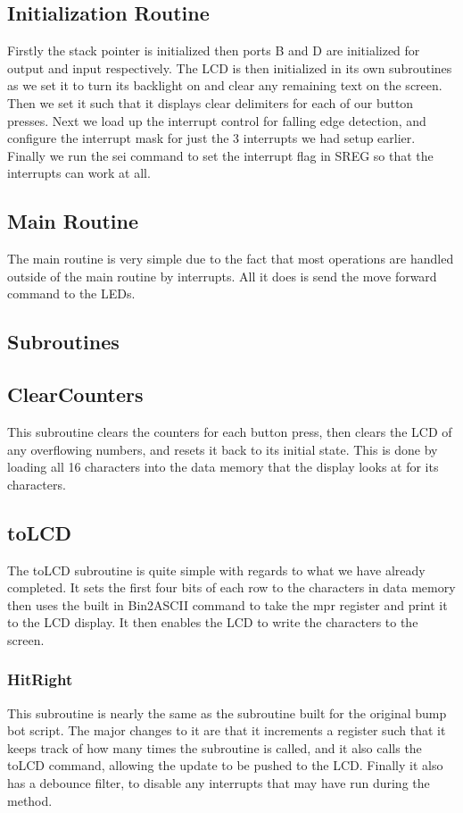 \documentclass[12pt,letterpaper]{article}
\begin{document}
\subsection{Initialization Routine}
Firstly the stack pointer is initialized then ports B and D are initialized for output and input respectively. The LCD is then initialized in its own subroutines as we set it to turn its backlight on and clear any remaining text on the screen. Then we set it such that it displays clear delimiters for each of our button presses. Next we load up the interrupt control for falling edge detection, and configure the interrupt mask for just the 3 interrupts we had setup earlier. Finally we run the sei command to set the interrupt flag in SREG so that the interrupts can work at all.

\subsection{Main Routine}
The main routine is very simple due to the fact that most operations are handled outside of the main routine by interrupts. All it does is send the move forward command to the LEDs.


\subsection{Subroutines}
	\subsection{ClearCounters}
	This subroutine clears the counters for each button press, then clears the LCD of any overflowing numbers, and resets it back to its initial state. This is done by loading all 16 characters into the data memory that the display looks at for its characters.  
	
	\subsection{toLCD}
	The toLCD subroutine is quite simple with regards to what we have already completed. It sets the first four bits of each row to the characters in data memory then uses the built in Bin2ASCII command to take the mpr register and print it to the LCD display. It then enables the LCD to write the characters to the screen.

	\subsubsection{HitRight}
	This subroutine is nearly the same as the subroutine built for the original bump bot script. The major changes to it are that it increments a register such that it keeps track of how many times the subroutine is called, and it also calls the toLCD command, allowing the update to be pushed to the LCD. Finally it also has a debounce filter, to disable any interrupts that may have run during the method.
	 
\end{document}
